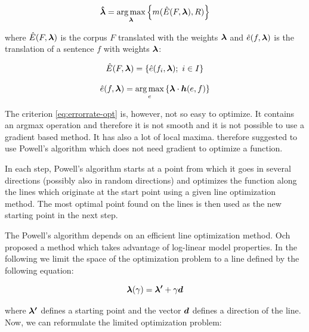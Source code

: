 \begin{equation}
  \boldsymbol{\hat\lambda} = \operatorname*{arg\,max}_{\boldsymbol{\lambda}} \left\{ m( \hat{E}(F,
  \boldsymbol{\lambda}), R ) \right\}
    \label{eq:errorrate-opt}
\end{equation}

\noindent where $\hat{E}(F, \boldsymbol{\lambda})$ is the corpus $F$ translated with
the weights $\boldsymbol{\lambda}$ and $\hat{e}(f, \boldsymbol{\lambda})$ is the
translation of a sentence $f$ with weights $\boldsymbol{\lambda}$:

\begin{equation}
  \hat{E}(F, \boldsymbol{\lambda}) = \left\{ \hat{e}(f_i, \boldsymbol{\lambda});~i \in I\right\}
    \label{eq:corpus-translation}
\end{equation}

\begin{equation}
  \hat{e}(f, \boldsymbol{\lambda}) = 
    \operatorname*{arg\,max}_{e} \left\{ \boldsymbol{\lambda} \cdot \boldsymbol{h}(e, f) \right\}
    \label{eq:sentence-translation}
\end{equation}

The criterion \eqref{eq:errorrate-opt} is, however, not so easy to optimize. It
contains an argmax operation and therefore it is not smooth and it is not possible
to use a gradient based method. It has also a lot of local maxima.
 therefore suggested to use Powell's algorithm
 which does not need gradient to optimize a function.

In each step, Powell's algorithm starts at a point from which it goes in
several directions (possibly also in random directions) and optimizes the
function along the lines which originate at the start point using a given line
optimization method. The most optimal point found on the lines is then used as
the new starting point in the next step. 

The Powell's algorithm depends on an efficient line optimization method. Och
proposed a method which takes advantage of log-linear model properties. In the
following we limit the space of the optimization problem to a line defined by
the following equation:

\begin{equation}
  \boldsymbol{\lambda}(\gamma) = \boldsymbol{\lambda'} + \gamma \boldsymbol{d}
  \label{eq:line}
\end{equation}

\noindent where $\boldsymbol{\lambda'}$ defines a starting point and the vector
$\boldsymbol{d}$ defines a direction of the line. Now, we can reformulate the limited
optimization problem:

